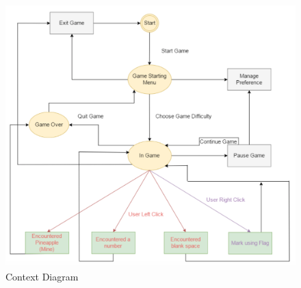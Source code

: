 \documentclass[12pt, titlepage]{article}
\begin{document}
\begin{figure}[!h]
	\includegraphics[width=\linewidth] {ContextFSM.png}
	\caption{Context Diagram}
\end{figure}
\end{document}
